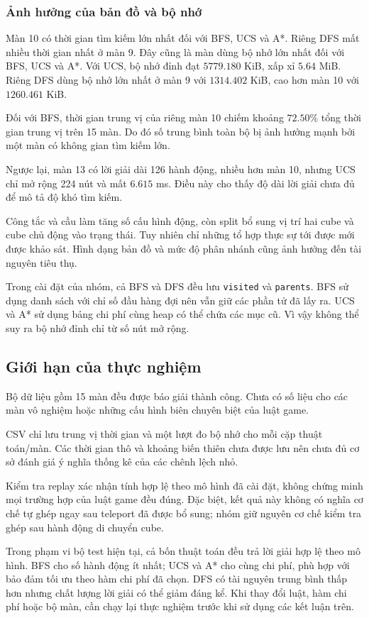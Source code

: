 \subsubsection{Ảnh hưởng của bản đồ và bộ nhớ}

Màn 10 có thời gian tìm kiếm lớn nhất đối với BFS, UCS và A*. Riêng DFS mất nhiều thời gian nhất ở màn 9.
Đây cũng là màn dùng bộ nhớ lớn nhất đối với BFS, UCS và A*.
Với UCS, bộ nhớ đỉnh đạt $5779.180$ KiB, xấp xỉ $5.64$ MiB.
Riêng DFS dùng bộ nhớ lớn nhất ở màn 9 với $1314.402$ KiB,
cao hơn màn 10 với $1260.461$ KiB.

Đối với BFS, thời gian trung vị của riêng màn 10 chiếm
khoảng $72.50\%$ tổng thời gian trung vị trên 15 màn.
Do đó số trung bình toàn bộ bị ảnh hưởng mạnh bởi
một màn có không gian tìm kiếm lớn.

Ngược lại, màn 13 có lời giải dài 126 hành động, nhiều hơn
màn 10, nhưng UCS chỉ mở rộng 224 nút và mất $6.615$ ms.
Điều này cho thấy độ dài lời giải chưa đủ để mô tả
độ khó tìm kiếm.

Công tắc và cầu làm tăng số cấu hình động, còn split bổ sung
vị trí hai cube và cube chủ động vào trạng thái.
Tuy nhiên chỉ những tổ hợp thực sự tới được mới được khảo sát.
Hình dạng bản đồ và mức độ phân nhánh cũng ảnh hưởng
đến tài nguyên tiêu thụ.

Trong cài đặt của nhóm, cả BFS và DFS đều lưu
\texttt{visited} và \texttt{parents}.
BFS sử dụng danh sách với chỉ số đầu hàng đợi nên vẫn giữ
các phần tử đã lấy ra. UCS và A* sử dụng bảng chi phí cùng
heap có thể chứa các mục cũ. Vì vậy không thể suy ra
bộ nhớ đỉnh chỉ từ số nút mở rộng.

\subsection{Giới hạn của thực nghiệm}

Bộ dữ liệu gồm 15 màn đều được báo giải thành công.
Chưa có số liệu cho các màn vô nghiệm hoặc những cấu hình
biên chuyên biệt của luật game.

CSV chỉ lưu trung vị thời gian và một lượt đo bộ nhớ
cho mỗi cặp thuật toán/màn. Các thời gian thô và khoảng
biến thiên chưa được lưu nên chưa đủ cơ sở đánh giá
ý nghĩa thống kê của các chênh lệch nhỏ.

Kiểm tra replay xác nhận tính hợp lệ theo mô hình đã
cài đặt, không chứng minh mọi trường hợp của luật game
đều đúng. Đặc biệt, kết quả này không có nghĩa cơ chế
tự ghép ngay sau teleport đã được bổ sung; nhóm giữ nguyên
cơ chế kiểm tra ghép sau hành động di chuyển cube.

Trong phạm vi bộ test hiện tại, cả bốn thuật toán đều
trả lời giải hợp lệ theo mô hình. BFS cho số hành động
ít nhất; UCS và A* cho cùng chi phí, phù hợp với bảo đảm
tối ưu theo hàm chi phí đã chọn. DFS có tài nguyên trung bình
thấp hơn nhưng chất lượng lời giải có thể giảm đáng kể.
Khi thay đổi luật, hàm chi phí hoặc bộ màn, cần chạy lại
thực nghiệm trước khi sử dụng các kết luận trên.
